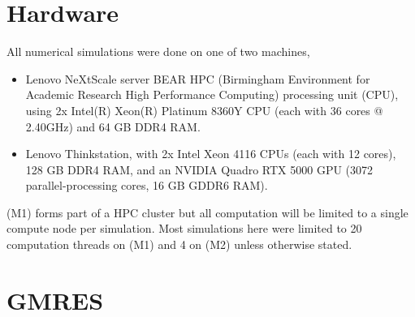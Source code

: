 \appendix
\FloatBarrier
\section{Hardware}\label{appendix:Hardware}
All numerical simulations were done on one of two machines,
\begin{itemize}
    \item [(M1)] Lenovo NeXtScale server BEAR HPC (Birmingham Environment for Academic Research High Performance Computing) processing unit (CPU), using 2x Intel(R) Xeon(R) Platinum 8360Y CPU  (each with 36 cores @ 2.40GHz) and 64 GB DDR4 RAM.
    \item [(M2)] Lenovo Thinkstation, with 2x Intel Xeon 4116 CPUs (each with 12 cores), 128 GB DDR4 RAM, and an NVIDIA Quadro RTX 5000 GPU (3072 parallel-processing cores, 16 GB GDDR6 RAM).
\end{itemize}
(M1) forms part of a HPC cluster but all computation will be limited to a single compute node per simulation. Most simulations here were limited to 20 computation threads on (M1) and 4 on (M2) unless otherwise stated.


\FloatBarrier
\section{GMRES}\label{appendix:GMRES}

